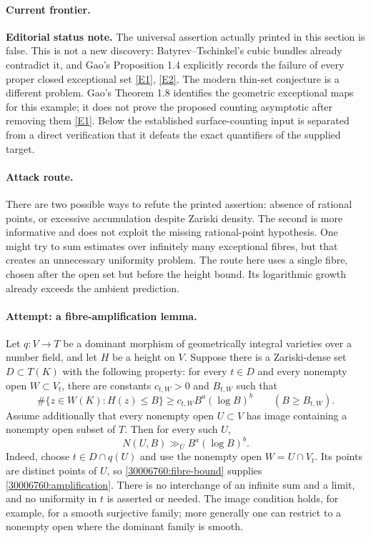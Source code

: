 \documentclass[11pt,a4paper]{article}
\newcommand{\eref}[2]{\hyperlink{extra:#1:#2}{[E#2]}}
\numberwithin{equation}{section}
\begin{document}
\paragraph{Current frontier.}
\textbf{Editorial status note.} The universal assertion actually printed in
this section is false. This is not a new discovery: Batyrev--Tschinkel's
cubic bundles already contradict it, and Gao's Proposition 1.4 explicitly
records the failure of every proper closed exceptional set
\eref{30006760}{1}, \eref{30006760}{2}. The modern thin-set conjecture is a different
problem. Gao's Theorem 1.8 identifies the geometric exceptional maps for
this example; it does not prove the proposed counting asymptotic after
removing them \eref{30006760}{1}. Below the established surface-counting input
is separated from a direct verification that it defeats the exact
quantifiers of the supplied target.

\paragraph{Attack route.}
There are two possible ways to refute the printed assertion: absence of
rational points, or excessive accumulation despite Zariski density. The
second is more informative and does not exploit the missing rational-point
hypothesis. One might try to sum estimates over infinitely many exceptional
fibres, but that creates an unnecessary uniformity problem. The route here
uses a single fibre, chosen after the open set but before the height bound.
Its logarithmic growth already exceeds the ambient prediction.

\paragraph{Attempt: a fibre-amplification lemma.}
Let $q:V\to T$ be a dominant morphism of geometrically integral varieties
over a number field, and let $H$ be a height on $V$. Suppose there is a
Zariski-dense set $D\subset T(K)$ with the following property: for every
$t\in D$ and every nonempty open $W\subset V_t$, there are constants
$c_{t,W}>0$ and $B_{t,W}$ such that
\begin{equation}\label{30006760:fibre-bound}
 \#\{z\in W(K):H(z)\le B\}\ge c_{t,W}B^a(\log B)^b
 \qquad(B\ge B_{t,W}).
\end{equation}
Assume additionally that every nonempty open $U\subset V$ has image
containing a nonempty open subset of $T$. Then for every such $U$,
\begin{equation}\label{30006760:amplification}
 N(U,B)\gg_U B^a(\log B)^b.
\end{equation}
Indeed, choose $t\in D\cap q(U)$ and use the nonempty open
$W=U\cap V_t$. Its points are distinct points of $U$, so
\eqref{30006760:fibre-bound} supplies \eqref{30006760:amplification}. There is no
interchange of an infinite sum and a limit, and no uniformity in $t$ is
asserted or needed. The image condition holds, for example, for a smooth
surjective family; more generally one can restrict to a nonempty open
where the dominant family is smooth.
\end{document}

